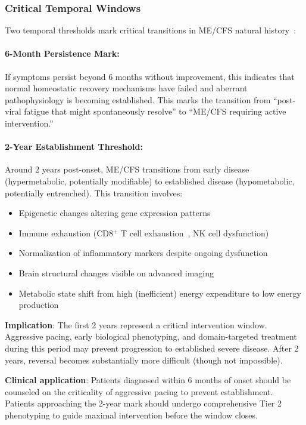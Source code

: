 \subsubsection{Critical Temporal Windows}

\begin{observation}
\label{obs:temporal-windows}
Two temporal thresholds mark critical transitions in ME/CFS natural history~\cite{Maksoud2020natural}:

\paragraph{6-Month Persistence Mark:}
If symptoms persist beyond 6 months without improvement, this indicates that normal homeostatic recovery mechanisms have failed and aberrant pathophysiology is becoming established. This marks the transition from ``post-viral fatigue that might spontaneously resolve'' to ``ME/CFS requiring active intervention.''

\paragraph{2-Year Establishment Threshold:}
Around 2 years post-onset, ME/CFS transitions from early disease (hypermetabolic, potentially modifiable) to established disease (hypometabolic, potentially entrenched). This transition involves:
\begin{itemize}
    \item Epigenetic changes altering gene expression patterns
    \item Immune exhaustion (CD8$^+$ T cell exhaustion~\cite{iu2024tcell_exhaustion}, NK cell dysfunction)
    \item Normalization of inflammatory markers despite ongoing dysfunction
    \item Brain structural changes visible on advanced imaging~\cite{Shan2020neuroimaging}
    \item Metabolic state shift from high (inefficient) energy expenditure to low energy production
\end{itemize}

\textbf{Implication}: The first 2 years represent a critical intervention window. Aggressive pacing, early biological phenotyping, and domain-targeted treatment during this period may prevent progression to established severe disease. After 2 years, reversal becomes substantially more difficult (though not impossible).

\textbf{Clinical application}: Patients diagnosed within 6 months of onset should be counseled on the criticality of aggressive pacing to prevent establishment. Patients approaching the 2-year mark should undergo comprehensive Tier 2 phenotyping to guide maximal intervention before the window closes.
\end{observation}

